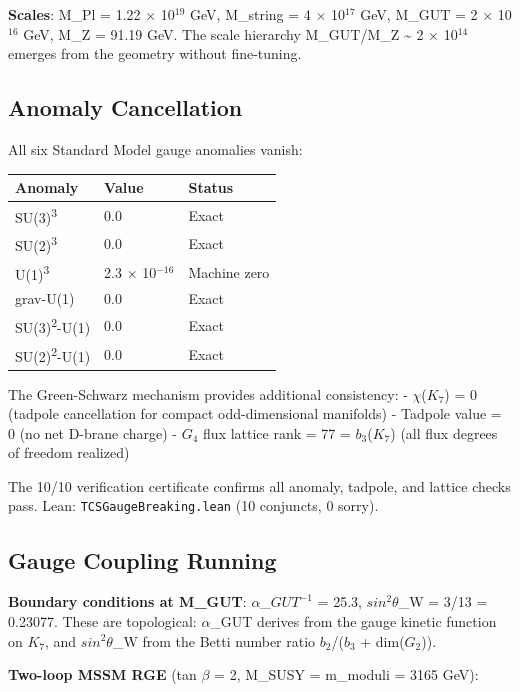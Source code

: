 \documentclass[11pt,a4paper]{article}
\begin{document}
\textbf{Scales}: M\_Pl = 1.22 \(\times\) 10\(^{19}\) GeV, M\_string = 4
\(\times\) 10\(^{17}\) GeV, M\_GUT = 2 \(\times\) 10\(^{16}\) GeV, M\_Z
= 91.19 GeV. The scale hierarchy M\_GUT/M\_Z \textasciitilde{} 2
\(\times\) 10\(^{14}\) emerges from the geometry without fine-tuning.

\subsection{Anomaly Cancellation}

All six Standard Model gauge anomalies vanish:

\begin{longtable}[]{@{}lll@{}}
\toprule\noalign{}
Anomaly & Value & Status \\
\midrule\noalign{}
\endhead
\bottomrule\noalign{}
\endlastfoot
SU(3)\textsuperscript{3} & 0.0 & Exact \\
SU(2)\textsuperscript{3} & 0.0 & Exact \\
U(1)\textsuperscript{3} & 2.3 \(\times\) 10\(^{-16}\) & Machine zero \\
grav-U(1) & 0.0 & Exact \\
SU(3)\textsuperscript{2}-U(1) & 0.0 & Exact \\
SU(2)\textsuperscript{2}-U(1) & 0.0 & Exact \\
\end{longtable}


The Green-Schwarz mechanism provides additional consistency: -
\(\chi\)(\(K_{7}\)) = 0 (tadpole cancellation for compact
odd-dimensional manifolds) - Tadpole value = 0 (no net D-brane charge) -
\(G_{4}\) flux lattice rank = 77 = \(b_{3}\)(\(K_{7}\)) (all flux
degrees of freedom realized)

The 10/10 verification certificate confirms all anomaly, tadpole, and
lattice checks pass. Lean: \texttt{TCSGaugeBreaking.lean} (10 conjuncts,
0 sorry).

\subsection{Gauge Coupling Running}

\textbf{Boundary conditions at M\_GUT}: \(\alpha\)\_\(GUT^{-1}\) = 25.3,
\(sin^{2} \theta\)\_W = 3/13 = 0.23077. These are topological:
\(\alpha\)\_GUT derives from the gauge kinetic function on \(K_{7}\),
and \(sin^{2} \theta\)\_W from the Betti number ratio
\(b_{2}\)/(\(b_{3}\) + dim(\(G_{2}\))).

\textbf{Two-loop MSSM RGE} (tan \(\beta\) = 2, M\_SUSY = m\_moduli =
3165 GeV):
\end{document}
